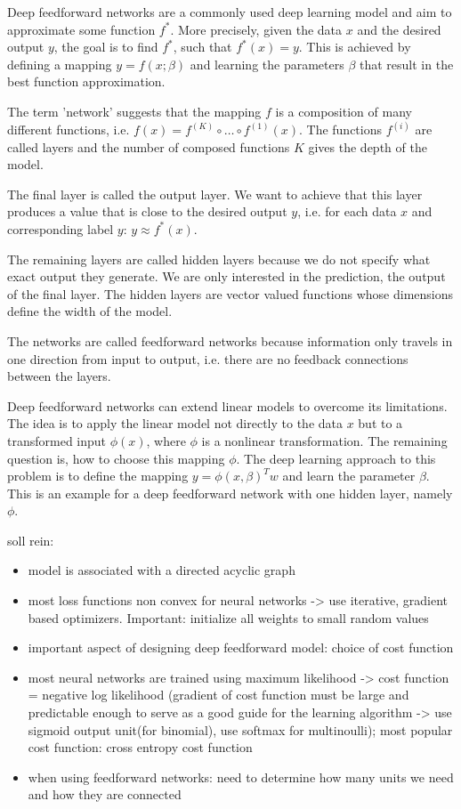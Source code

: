 \documentclass[12pt, a4paper]{article}
\theoremstyle{definition}
\theoremstyle{plain}
\numberwithin{equation}{section}
\numberwithin{figure}{section}
\numberwithin{table}{section}
\begin{document}
	Deep feedforward networks are a commonly used deep learning model and aim to approximate some function $f^*$.
	More precisely, given the data $x$ and the desired output $y$, the goal is to find $f^*$, such that $f^*(x)=y$.
	This is achieved by defining a mapping $y = f(x; \beta)$ and learning the parameters $\beta$ that result in the best function approximation.
	
	The term 'network' suggests that the mapping $f$ is a composition of many different functions, i.e.
	$ f(x) = f^{(K)}\circ \dots \circ f^{(1)}(x)$.
	The functions $f^{(i)}$ are called layers and the number of composed functions $K$ gives the depth of the model.
	
	The final layer is called the output layer.
	We want to achieve that this layer produces a value that is close to the desired output $y$, i.e. for each data $x$ and corresponding label $y$: $y \approx f^*(x)$.
	
	The remaining layers are called hidden layers because we do not specify what exact output they generate.
	We are only interested in the prediction, the output of the final layer.
	The hidden layers are vector valued functions whose dimensions define the width of the model.
	
	The networks are called feedforward networks because information only travels in one direction from input to output, i.e. there are no feedback connections between the layers.
	
	Deep feedforward networks can extend linear models to overcome its limitations.
	The idea is to apply the linear model not directly to the data $x$ but to a transformed input $\phi(x)$, where $\phi$ is a nonlinear transformation.
	The remaining question is, how to choose this mapping $\phi$.
	The deep learning approach to this problem is to define the mapping $y = \phi(x, \beta)^Tw$ and learn the parameter $\beta$.
	This is an example for a deep feedforward network with one hidden layer, namely $\phi$.
	
	
	soll rein:
	\begin{itemize}
		\item model is associated with a directed acyclic graph
		\item most loss functions non convex for neural networks -> use iterative, gradient based optimizers. Important: initialize all weights to small random values
		\item important aspect of designing deep feedforward model: choice of cost function
		\item most neural networks are trained using maximum likelihood -> cost function = negative log likelihood (gradient of cost function must be large and predictable enough to serve as a good guide for the learning algorithm -> use sigmoid output unit(for binomial), use softmax for multinoulli); most popular cost function: cross entropy cost function
		\item when using feedforward networks: need to determine how many units we need and how they are connected
	\end{itemize}
	
\end{document}
